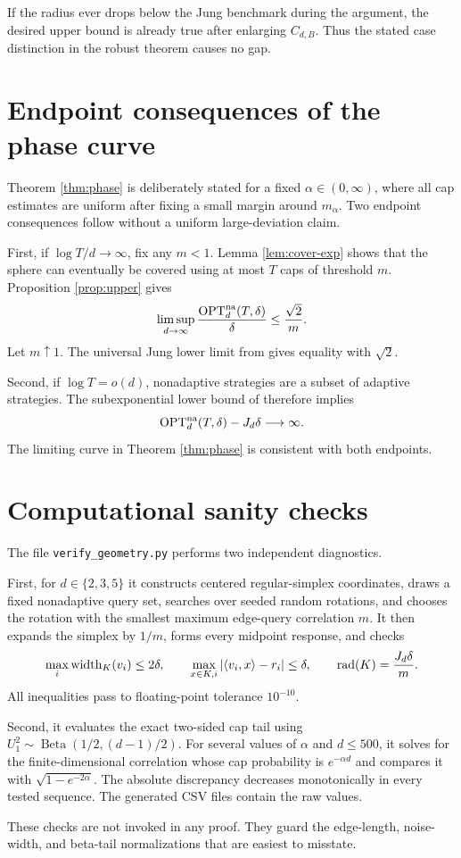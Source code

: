If the radius ever drops below the Jung benchmark during the argument, the
desired upper bound is already true after enlarging $C_{d,B}$.  Thus the stated
case distinction in the robust theorem causes no gap.

\section{Endpoint consequences of the phase curve}                 \label{app:endpoints}

Theorem \ref{thm:phase} is deliberately stated for a fixed
$\alpha\in(0,\infty)$, where all cap estimates are uniform after fixing a small
margin around $m_\alpha$.  Two endpoint consequences follow without a uniform
large-deviation claim.

First, if $\log T/d\to\infty$, fix any $m<1$.  Lemma
\ref{lem:cover-exp} shows that the sphere can eventually be covered using at
most $T$ caps of threshold $m$.  Proposition \ref{prop:upper} gives
\[
 \limsup_{d\to\infty}\frac{\operatorname{OPT}^{\mathrm{na}}_d(T,\delta)}{\delta}
 \leq\frac{\sqrt2}{m}.
\]
Let $m\uparrow1$.  The universal Jung lower limit from
\citet{filmus2026optimal} gives equality with $\sqrt2$.

Second, if $\log T=o(d)$, nonadaptive strategies are a subset of adaptive
strategies.  The subexponential lower bound of \citet{filmus2026optimal}
therefore implies
\[
 \operatorname{OPT}^{\mathrm{na}}_d(T,\delta)-J_d\delta\longrightarrow\infty.
\]
The limiting curve in Theorem \ref{thm:phase} is consistent with both
endpoints.

\section{Computational sanity checks}                               \label{app:checks}

The file \texttt{verify\_geometry.py} performs two independent diagnostics.

First, for $d\in\{2,3,5\}$ it constructs centered regular-simplex coordinates,
draws a fixed nonadaptive query set, searches over seeded random rotations, and
chooses the rotation with the smallest maximum edge-query correlation $m$.  It
then expands the simplex by $1/m$, forms every midpoint response, and checks
\[
 \max_i\operatorname{width}_K(v_i)\leq2\delta,
 \qquad
 \max_{x\in K,i}|\langle v_i,x\rangle-r_i|\leq\delta,
 \qquad
 \operatorname{rad}(K)=\frac{J_d\delta}{m}.
\]
All inequalities pass to floating-point tolerance $10^{-10}$.

Second, it evaluates the exact two-sided cap tail using
$U_1^2\sim\operatorname{Beta}(1/2,(d-1)/2)$.  For several values of $\alpha$
and $d\leq500$, it solves for the finite-dimensional correlation whose cap
probability is $e^{-\alpha d}$ and compares it with
$\sqrt{1-e^{-2\alpha}}$.  The absolute discrepancy decreases monotonically in
every tested sequence.  The generated CSV files contain the raw values.

These checks are not invoked in any proof.  They guard the edge-length,
noise-width, and beta-tail normalizations that are easiest to misstate.
